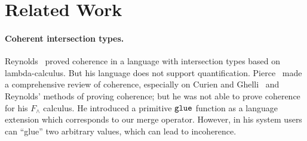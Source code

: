 \section{Related Work}
\label{sec:related-work}

\paragraph{Coherent intersection types.}

Reynolds~\cite{reynolds1991coherence} proved coherence in a language with
intersection types based on lambda-calculus. But his language does not support
quantification. Pierce~\cite{pierce1991programming2} made a comprehensive review
of coherence, especially on Curien and Ghelli~\cite{curienl1990coherence} and
Reynolds' methods of proving coherence; but he was not able to prove coherence
for his $F_\wedge$ calculus. He introduced a primitive $\texttt{glue}$ function as
a language extension which corresponds to our merge operator. However, in his
system users can ``glue'' two arbitrary values, which can lead to incoherence.






